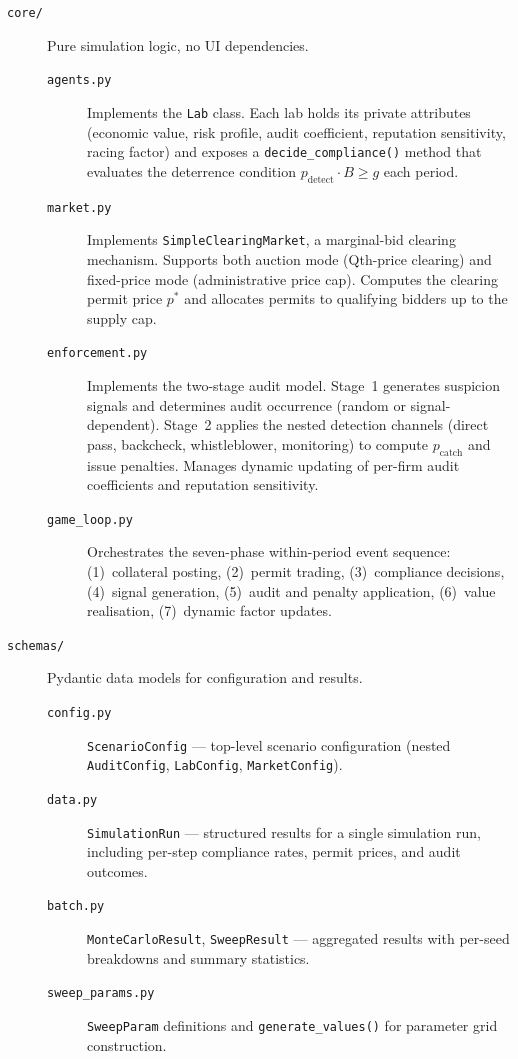 \begin{description}
    \item[\texttt{core/}] Pure simulation logic, no UI dependencies.
    \begin{description}
        \item[\texttt{agents.py}] Implements the \texttt{Lab} class. Each lab holds its private attributes (economic value, risk profile, audit coefficient, reputation sensitivity, racing factor) and exposes a \texttt{decide\_compliance()} method that evaluates the deterrence condition $p_{\mathrm{detect}} \cdot B \geq g$ each period.
        \item[\texttt{market.py}] Implements \texttt{SimpleClearingMarket}, a marginal-bid clearing mechanism. Supports both auction mode (Qth-price clearing) and fixed-price mode (administrative price cap). Computes the clearing permit price $p^*$ and allocates permits to qualifying bidders up to the supply cap.
        \item[\texttt{enforcement.py}] Implements the two-stage audit model. Stage~1 generates suspicion signals and determines audit occurrence (random or signal-dependent). Stage~2 applies the nested detection channels (direct pass, backcheck, whistleblower, monitoring) to compute $p_{\mathrm{catch}}$ and issue penalties. Manages dynamic updating of per-firm audit coefficients and reputation sensitivity.
        \item[\texttt{game\_loop.py}] Orchestrates the seven-phase within-period event sequence: (1)~collateral posting, (2)~permit trading, (3)~compliance decisions, (4)~signal generation, (5)~audit and penalty application, (6)~value realisation, (7)~dynamic factor updates.
    \end{description}

    \item[\texttt{schemas/}] Pydantic data models for configuration and results.
    \begin{description}
        \item[\texttt{config.py}] \texttt{ScenarioConfig} — top-level scenario configuration (nested \texttt{AuditConfig}, \texttt{LabConfig}, \texttt{MarketConfig}).
        \item[\texttt{data.py}] \texttt{SimulationRun} — structured results for a single simulation run, including per-step compliance rates, permit prices, and audit outcomes.
        \item[\texttt{batch.py}] \texttt{MonteCarloResult}, \texttt{SweepResult} — aggregated results with per-seed breakdowns and summary statistics.
        \item[\texttt{sweep\_params.py}] \texttt{SweepParam} definitions and \texttt{generate\_values()} for parameter grid construction.
    \end{description}


\end{description}
